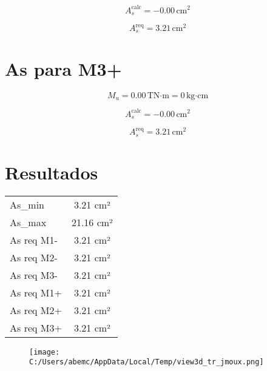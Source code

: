\documentclass[12pt]{article}
\begin{document}
\[
A_s^{\text{calc}} = -0.00\,\text{cm}^2
\]

\[
A_s^{\text{req}} = 3.21\,\text{cm}^2
\]

\vspace{0.5cm}

\section*{ As para M3+ }

\[
M_u = 0.00\,\text{TN·m} = 0\,\text{kg·cm}
\]

\[
A_s^{\text{calc}} = -0.00\,\text{cm}^2
\]

\[
A_s^{\text{req}} = 3.21\,\text{cm}^2
\]

\vspace{0.5cm}



\section*{Resultados}
\begin{tabular}{|l|c|}
\hline

As_min & 3.21 cm² \\

As_max & 21.16 cm² \\

As req M1- & 3.21 cm² \\

As req M2- & 3.21 cm² \\

As req M3- & 3.21 cm² \\

As req M1+ & 3.21 cm² \\

As req M2+ & 3.21 cm² \\

As req M3+ & 3.21 cm² \\

\hline
\end{tabular}



\begin{figure}[H]
\centering
\texttt{[image: C:/Users/abemc/AppData/Local/Temp/view3d\_tr\_jmoux.png]}
\end{figure}
\end{document}

